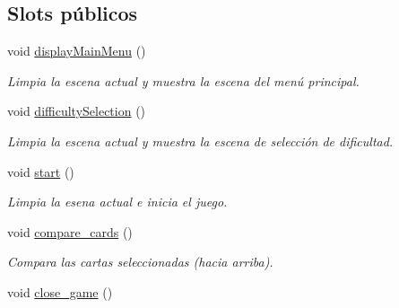 \subsection*{Slots públicos}
\begin{DoxyCompactItemize}
\item 
\hypertarget{classGame__c_a6a23071ddbebafadca771990d358459b}{void \hyperlink{classGame__c_a6a23071ddbebafadca771990d358459b}{display\-Main\-Menu} ()}\label{classGame__c_a6a23071ddbebafadca771990d358459b}

\begin{DoxyCompactList}\small\item\em Limpia la escena actual y muestra la escena del menú principal. \end{DoxyCompactList}\item 
\hypertarget{classGame__c_a986d16f14b85fc936ae409277386b43d}{void \hyperlink{classGame__c_a986d16f14b85fc936ae409277386b43d}{difficulty\-Selection} ()}\label{classGame__c_a986d16f14b85fc936ae409277386b43d}

\begin{DoxyCompactList}\small\item\em Limpia la escena actual y muestra la escena de selección de dificultad. \end{DoxyCompactList}\item 
\hypertarget{classGame__c_ada099e6da914d235646104b2d6cc0e51}{void \hyperlink{classGame__c_ada099e6da914d235646104b2d6cc0e51}{start} ()}\label{classGame__c_ada099e6da914d235646104b2d6cc0e51}

\begin{DoxyCompactList}\small\item\em Limpia la esena actual e inicia el juego. \end{DoxyCompactList}\item 
\hypertarget{classGame__c_a111258ab784c8a7d75a04e5876a72546}{void \hyperlink{classGame__c_a111258ab784c8a7d75a04e5876a72546}{compare\-\_\-cards} ()}\label{classGame__c_a111258ab784c8a7d75a04e5876a72546}

\begin{DoxyCompactList}\small\item\em Compara las cartas seleccionadas (hacia arriba). \end{DoxyCompactList}\item 
\hypertarget{classGame__c_a02fab778c8803477b80bcc2521778b59}{void \hyperlink{classGame__c_a02fab778c8803477b80bcc2521778b59}{close\-\_\-game} ()}\label{classGame__c_a02fab778c8803477b80bcc2521778b59}


\end{DoxyCompactItemize}
